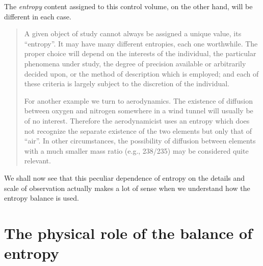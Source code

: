 \documentclass[a4paper,12pt,%
onecolumn,oneside,%
british%
]{memoir}
\renewcommand*{\|}[1][]{\nonscript\:#1\vert\nonscript\:\mathopen{}}
\newcommand*{\sect}{\S}%
\begin{document}
The \emph{entropy} content assigned to this control volume, on the other hand, will be different in each case.
\begin{quote}\footnotesize
A given object of study cannot always be assigned a unique value, its ``entropy''. It may have many different entropies, each one worthwhile. The proper choice will depend on the interests of the individual, the particular phenomena under study, the degree of precision available or arbitrarily decided upon, or the method of description which is employed; and each of these criteria is largely subject to the discretion of the individual. \textelp{}


For another example we turn to aerodynamics. The existence of diffusion between oxygen and nitrogen somewhere in a wind tunnel will usually be of no interest. Therefore the aerodynamicist uses an entropy which does not recognize the separate existence of the two elements but only that of ``air''. In other circumstances, the possibility of diffusion between elements with a much smaller mass ratio (e.g., 238/235) may be considered quite relevant.
\sourceatright{\parencites[\sect\,1 pp.~323, 325]{grad1961}}
\end{quote}


We shall now see that this peculiar dependence of entropy on the details and scale of observation actually makes a lot of sense when we understand how the entropy balance is used.


\section{The physical role of the balance of entropy}
\label{sec:entropy_balance_role}
\end{document}

